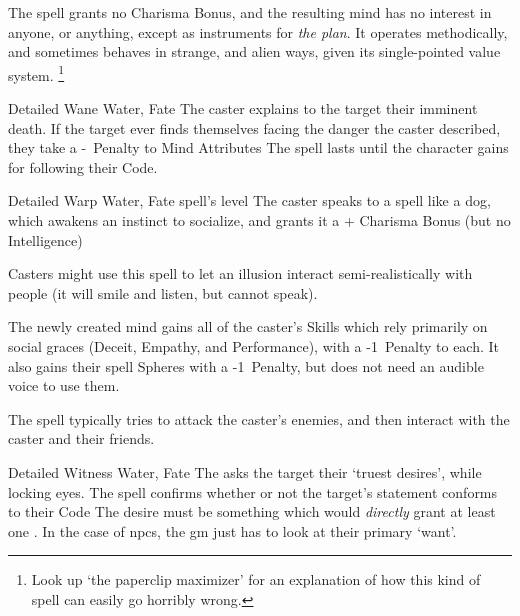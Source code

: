 \begin{multicols}{2}
{  The spell grants no Charisma Bonus, and the resulting mind has no interest in anyone, or anything, except as instruments for \emph{the plan}.
  It operates methodically, and sometimes behaves in strange, and alien ways, given its single-pointed value system.%
  \footnote{Look up `the paperclip maximizer' for an explanation of how this kind of spell can easily go horribly wrong.}
  }

  {Detailed}%
  {Wane}%
  {Water, Fate}%
  {}%
  {The caster explains to the target their imminent death.
    If the target ever finds themselves facing the danger the caster described, they take a -~Penalty to Mind Attributes}%
  {The spell lasts until the character gains  for following their Code.}




  {Detailed}%
  {Warp}%
  {Water, Fate}%
  {spell's level}%
  {The caster speaks to a spell like a dog, which awakens an instinct to socialize, and grants it a + Charisma Bonus (but no Intelligence)}%
  {
  Casters might use this spell to let an illusion interact semi-realistically with people (it will smile and listen, but cannot speak).

  The newly created mind gains all of the caster's Skills which rely primarily on social graces (Deceit, Empathy, and Performance), with a -1~Penalty to each.
  It also gains their spell Spheres with a -1~Penalty, but does not need an audible voice to use them.

  The spell typically tries to attack the caster's enemies, and then interact with the caster and their friends.

  }

  {Detailed}%
  {Witness}%
  {Water, Fate}%
  {}%
  {The  asks the target their `truest desires', while locking eyes.
    The spell confirms whether or not the target's statement conforms to their Code}%
  {The desire must be something which would \textit{directly} grant at least one .%
  In the case of \glspl{npc}, the \gls{gm} just has to look at their primary `want'.}


\end{multicols}
